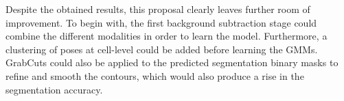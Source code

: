 \documentclass[10pt,twocolumn,letterpaper]{article}
\begin{document}
Despite the obtained results, this proposal clearly leaves further room of improvement. To
begin with, the first background subtraction stage could combine the different modalities
in order to learn the model. Furthermore, a clustering of poses at cell-level could be
added before learning the GMMs. GrabCuts could also be applied to the predicted
segmentation binary masks to refine and smooth the contours, which would also produce
a rise in the segmentation accuracy.
{\small


}
\end{document}
